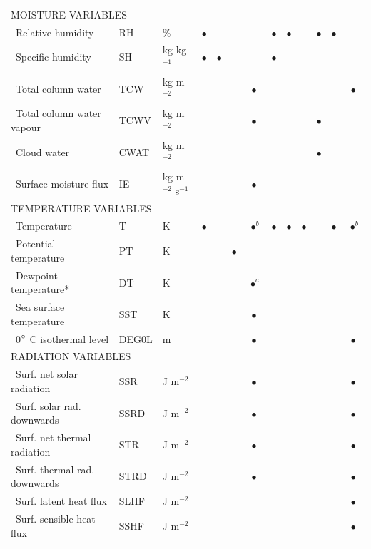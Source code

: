 \documentclass[draft]{agujournal2019}
\begin{document}
\begin{table}[!htbp]
{\begin{tabular}{lll|cccc|cccc|cc}
		\hline
		\multicolumn{3}{l|}{\uppercase{Moisture variables}} & & & & & & & & & & \\
		\ Relative humidity & RH & \% & $\bullet$ &  &  &  & $\bullet$ & $\bullet$ &  & $\bullet$ & $\bullet$ & \\
		\ Specific humidity & SH & kg kg$^{-1}$ & $\bullet$ & $\bullet$ &  &  & $\bullet$ &  &  & & &  \\
		\ Total column water & TCW & kg m$^{-2}$ &  &  &  & $\bullet$ &  &  &  &  & & $\bullet$\\
		\ Total column water vapour & TCWV & kg m$^{-2}$ &  &  &  & $\bullet$ &  &  &  & $\bullet$ & & \\
		\ Cloud water & CWAT & kg m$^{-2}$ &  &  &  &  &  &  &  & $\bullet$ & & \\
		\ Surface moisture flux & IE & kg m$^{-2}$ s$^{-1}$ &  &  &  & $\bullet$ &  &  &  &  & & \\
		\hline
		\multicolumn{3}{l|}{\uppercase{Temperature variables}} & & & & & & & & & & \\
		\ Temperature & T & K & $\bullet$ &  &  & $^{\ }\bullet^{b}$ & $\bullet$ & $\bullet$ & $\bullet$ &  & $\bullet$ & $^{\ }\bullet^{b}$ \\
		\ Potential temperature & PT & K &  &  & $\bullet$ &  &  &  &  &  & & \\
		\ Dewpoint temperature* & DT & K &  &  &  & $^{\ }\bullet^{a}$ &  &  &  &  & & \\
		\ Sea surface temperature & SST & K &  &  &  & $\bullet$ &  &  &  & & &  \\
		\ 0$\degree$ C isothermal level & DEG0L & m &  &  &  & $\bullet$ &  &  &  & & & $\bullet$ \\
		\hline
		\multicolumn{3}{l|}{\uppercase{Radiation variables}} & & & & & & & & & & \\
		\ Surf. net solar radiation & SSR & J m$^{-2}$ &  &  &  & $\bullet$ &  &  &  & & & $\bullet$ \\
		\ Surf. solar rad. downwards & SSRD & J m$^{-2}$ &  &  &  & $\bullet$ &  &  &  & & & $\bullet$ \\
		\ Surf. net thermal radiation & STR & J m$^{-2}$ &  &  &  & $\bullet$ &  &  &  & & & $\bullet$ \\
		\ Surf. thermal rad. downwards & STRD & J m$^{-2}$ &  &  &  & $\bullet$ &  &  &  & & & $\bullet$ \\
		\ Surf. latent heat flux & SLHF & J m$^{-2}$ &  &  &  &  &  &  &  & & & $\bullet$ \\
		\ Surf. sensible heat flux & SSHF & J m$^{-2}$ &  &  &  &  &  &  &  & & & $\bullet$ \\

\end{tabular}}
\end{table}
\end{document}
